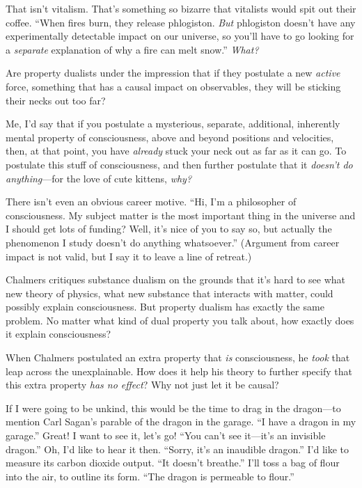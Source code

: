 {
 That isn't vitalism. That's
something so bizarre that vitalists would spit out their coffee.
``When fires burn, they release phlogiston.
\textit{But} phlogiston doesn't have any experimentally
detectable impact on our universe, so you'll have to go
looking for a \textit{separate} explanation of why a fire can melt
snow.'' \textit{What?}}

{
 Are property dualists under the impression that if they postulate
a new \textit{active} force, something that has a causal impact on
observables, they will be sticking their necks out too far?}

{
 Me, I'd say that if you postulate a mysterious,
separate, additional, inherently mental property of consciousness,
above and beyond positions and velocities, then, at that point, you
have \textit{already} stuck your neck out as far as it can go. To
postulate this stuff of consciousness, and then further postulate that
it \textit{doesn't do anything}{}---for the love of
cute kittens, \textit{why?}}

{
 There isn't even an obvious career motive.
``Hi, I'm a philosopher of
consciousness. My subject matter is the most important thing in the
universe and I should get lots of funding? Well, it's
nice of you to say so, but actually the phenomenon I study
doesn't do anything whatsoever.''
(Argument from career impact is not valid, but I say it to leave a line
of retreat.)}

{
 Chalmers critiques substance dualism on the grounds that
it's hard to see what new theory of physics, what new
substance that interacts with matter, could possibly explain
consciousness. But property dualism has exactly the same problem. No
matter what kind of dual property you talk about, how exactly does it
explain consciousness?}

{
 When Chalmers postulated an extra property that \textit{is}
consciousness, he \textit{took} that leap across the unexplainable. How
does it help his theory to further specify that this extra property
\textit{has no effect}? Why not just let it be causal?}

{
 If I were going to be unkind, this would be the time to drag in
the dragon---to mention Carl Sagan's parable of the
dragon in the garage. ``I have a dragon in my
garage.'' Great! I want to see it,
let's go! ``You can't
see it---it's an invisible dragon.''
Oh, I'd like to hear it then. ``Sorry,
it's an inaudible dragon.''
I'd like to measure its carbon dioxide output.
``It doesn't
breathe.'' I'll toss a bag of flour
into the air, to outline its form. ``The dragon is
permeable to flour.''}

